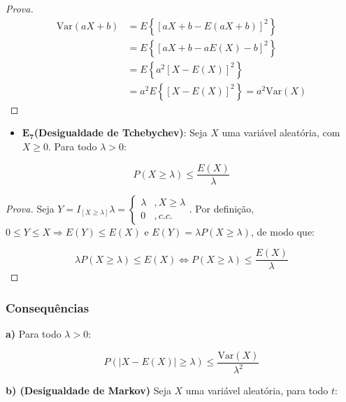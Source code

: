 \documentclass[
]{article}
\providecommand{\tightlist}{%
  \setlength{\itemsep}{0pt}\setlength{\parskip}{0pt}}
\theoremstyle{definition}
\theoremstyle{definition}
\theoremstyle{definition}
\theoremstyle{definition}
\theoremstyle{remark}
\begin{document}
\begin{proof}[Prova]
\begin{align*}
\mathrm{Var}(aX + b) &= E\left\{\left[aX + b - E(aX + b)\right]^{2}\right\} \\
&= E\left\{\left[aX + b - aE(X) - b\right]^{2}\right\} \\
&= E\left\{a^{2}\left[X - E(X)\right]^{2}\right\} \\
&= a^{2}E\left\{\left[X - E(X)\right]^{2}\right\} = a^{2}\mathrm{Var}(X)
\end{align*}
\end{proof}

\begin{itemize}
\tightlist
\item
  \(\mathbf{E_{7}}\)\textbf{(Desigualdade de Tchebychev)}: Seja \(X\) uma variável aleatória, com \(X \ge 0\). Para todo \(\lambda > 0\):
\end{itemize}

\begin{equation}
P(X \ge \lambda) \le \frac{E(X)}{\lambda}
\label{eq:desigcheby}
\end{equation}

\begin{proof}[Prova]
Seja \(Y = I_{[X \ge \lambda]}\lambda = \begin{cases}\lambda &,X \ge \lambda \\ 0 &,c.c.\end{cases}\). Por definição, \(0 \le Y \le X \Rightarrow E(Y) \le E(X)\) e \(E(Y) = \lambda P(X \ge \lambda)\), de modo que:

\begin{equation*}
\lambda P(X \ge \lambda) \le E(X) \Leftrightarrow P(X \ge \lambda) \le \frac{E(X)}{\lambda}
\end{equation*}
\end{proof}

\hypertarget{consequuxeancias}{%
\subsubsection{Consequências}\label{consequuxeancias}}

\textbf{a)} Para todo \(\lambda>0\):

\begin{equation*}
P(|X - E(X)| \ge \lambda) \le \frac{\mathrm{Var}(X)}{\lambda^{2}}
\end{equation*}

\textbf{b) (Desigualdade de Markov)} Seja \(X\) uma variável aleatória, para todo \(t\):
\end{document}
